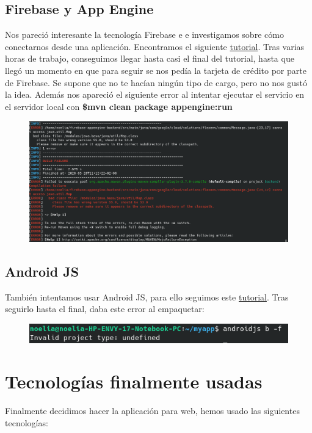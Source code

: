 \documentclass{article}
\begin{document}
 	\subsection{Firebase y App Engine}
 	Nos pareció interesante la tecnología Firebase e
 	e investigamos sobre cómo conectarnos desde una aplicación. Encontramos el siguiente \href{https://cloud.google.com/solutions/mobile/mobile-firebase-app-engine-flexible}{tutorial}. Tras varias horas de trabajo, conseguimos llegar hasta casi el final del tutorial, hasta que llegó un momento en que para seguir se nos pedía la tarjeta de crédito por parte de Firebase. Se supone que no te hacían ningún tipo de cargo, pero no nos gustó la idea. Además nos apareció el siguiente error al intentar ejecutar el servicio en el servidor local con {\bf \$mvn clean package appengine:run}
 	\begin{figure}[H]
 		\centering
 		\includegraphics[totalheight=5.7cm]{img/3.png}
 	\end{figure}
 	\subsection{Android JS}
 	También intentamos usar Android JS, para ello seguimos este \href{https://blog.usejournal.com/how-to-build-android-apps-with-node-js-using-android-js-2aa4643be87b}{tutorial}. Tras seguirlo hasta el final, daba este error al empaquetar:
 	\begin{figure}[H]
 		\centering
 		\includegraphics[totalheight=0.92cm]{img/4.png}
 	\end{figure}
 	\section{Tecnologías finalmente usadas}
 	Finalmente decidimos hacer la aplicación para web, hemos usado las siguientes tecnologías:
\end{document}
